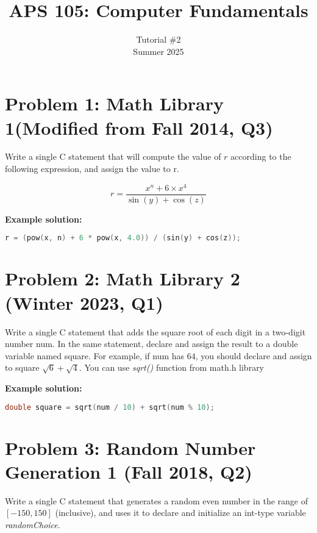 \documentclass[12pt]{article}
\begin{document}
 
 
\title{APS 105: Computer Fundamentals}
\date{}
\author{Tutorial \#2\\ 
Summer 2025}

\maketitle

\section*{Problem 1: Math Library 1(Modified from Fall 2014, Q3)}
Write a single C statement that will compute the value of $r$ according to the following expression, and assign the value to r.

\begin{equation}
	r=\frac{x^n+6\times x^4}{\sin(y)+\cos(z)}
\end{equation}

\textbf{Example solution:}
\begin{lstlisting}[language=C]
r = (pow(x, n) + 6 * pow(x, 4.0)) / (sin(y) + cos(z));
\end{lstlisting}

\section*{Problem 2: Math Library 2 (Winter 2023, Q1)}

Write a single C statement that adds the square root of each digit in a two-digit number num. In the same statement, declare and assign the result to a double variable named square. For example, if num has $64$, you should declare and assign to square $\sqrt{6}+\sqrt{4}$.
You can use \textit{sqrt()} function from math.h library

\textbf{Example solution:}
\begin{lstlisting}[language=C]
double square = sqrt(num / 10) + sqrt(num % 10);
\end{lstlisting}

\section*{Problem 3: Random Number Generation 1 (Fall 2018, Q2)}
Write a single C statement that generates a random even number in the range of $[-150, 150]$ (inclusive), and uses it to declare and initialize an int-type variable \textit{randomChoice}.
\end{document}
